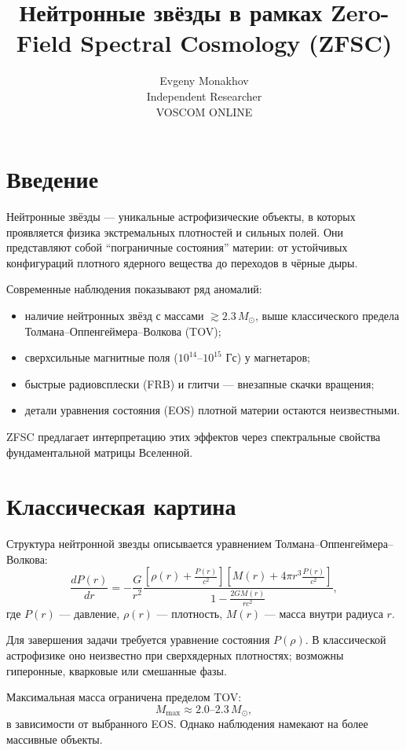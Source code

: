 \documentclass[a4paper,12pt]{article}
\begin{document}
\title{Нейтронные звёзды в рамках Zero-Field Spectral Cosmology (ZFSC)}
\author{Evgeny Monakhov \\ Independent Researcher \\ VOSCOM ONLINE}
\date{}
\maketitle

\section*{Введение}
Нейтронные звёзды --- уникальные астрофизические объекты, в которых проявляется физика экстремальных плотностей и сильных полей. Они представляют собой ``пограничные состояния'' материи: от устойчивых конфигураций плотного ядерного вещества до переходов в чёрные дыры.  

Современные наблюдения показывают ряд аномалий:
\begin{itemize}
  \item наличие нейтронных звёзд с массами $\gtrsim 2.3\,M_\odot$, выше классического предела Толмана--Оппенгеймера--Волкова (TOV);
  \item сверхсильные магнитные поля ($10^{14}$--$10^{15}$ Гс) у магнетаров;
  \item быстрые радиовсплески (FRB) и глитчи --- внезапные скачки вращения;
  \item детали уравнения состояния (EOS) плотной материи остаются неизвестными.
\end{itemize}

ZFSC предлагает интерпретацию этих эффектов через спектральные свойства фундаментальной матрицы Вселенной.

\section*{Классическая картина}
Структура нейтронной звезды описывается уравнением Толмана--Оппенгеймера--Волкова:
\[
\frac{dP(r)}{dr} = -\frac{G}{r^2}\frac{\left[\rho(r)+\frac{P(r)}{c^2}\right]\left[M(r)+4\pi r^3 \frac{P(r)}{c^2}\right]}{1-\frac{2GM(r)}{rc^2}},
\]
где $P(r)$ --- давление, $\rho(r)$ --- плотность, $M(r)$ --- масса внутри радиуса $r$.  

Для завершения задачи требуется уравнение состояния $P(\rho)$. В классической астрофизике оно неизвестно при сверхядерных плотностях; возможны гиперонные, кварковые или смешанные фазы.  

Максимальная масса ограничена пределом TOV:
\[
M_{\text{max}} \approx 2.0\text{--}2.3\,M_\odot,
\]
в зависимости от выбранного EOS. Однако наблюдения намекают на более массивные объекты.
\end{document}
